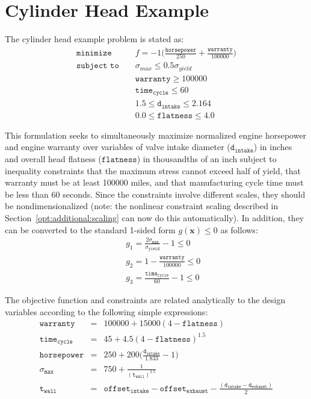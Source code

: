 \section{Cylinder Head Example}\label{additional:cylinder}

The cylinder head example problem is stated as:
\begin{eqnarray}
\texttt{minimize }   & & f=-1\bigg(\frac{\mathtt{horsepower}}{250}+
  \frac{\mathtt{warranty}}{100000}\bigg) \nonumber\\
\texttt{subject to } & & \sigma_{max} \leq 0.5 \sigma_{yield}
  \label{additional:cylhead}\\
                     & & \mathtt{warranty} \geq 100000          \nonumber\\
                     & & \mathtt{time_{cycle}} \leq 60          \nonumber\\
                     & & 1.5 \leq \mathtt{d_{intake}} \leq 2.164\nonumber\\
                     & & 0.0 \leq \mathtt{flatness} \leq 4.0    \nonumber
\end{eqnarray}

This formulation seeks to simultaneously maximize normalized engine
horsepower and engine warranty over variables of valve intake diameter
($\mathtt{d_{intake}}$) in inches and overall head flatness
($\mathtt{flatness}$) in thousandths of an inch subject to inequality
constraints that the maximum stress cannot exceed half of yield, that
warranty must be at least 100000 miles, and that manufacturing cycle
time must be less than 60 seconds. Since the constraints involve
different scales, they should be nondimensionalized (note: the
nonlinear constraint scaling described in
Section~\ref{opt:additional:scaling} can now do this
automatically). In addition, they can be converted to the standard
1-sided form $g(\mathbf{x}) \leq 0$ as follows:
\begin{eqnarray}
  & & g_1=\frac{2\sigma_{\mathtt{max}}}{\sigma_{\mathtt{yield}}}-1 \leq 0
  \nonumber\\
  & & g_2=1-\frac{\mathtt{warranty}}{100000} \leq 0
  \label{additional:cylheadaltg}\\
  & & g_3=\frac{\mathtt{time_{cycle}}}{60}-1 \leq 0\nonumber
\end{eqnarray}

The objective function and constraints are related analytically to the
design variables according to the following simple expressions:
\begin{eqnarray}
\mathtt{warranty}     &=& 100000+15000(4-\mathtt{flatness})\nonumber\\
\mathtt{time_{cycle}} &=& 45+4.5(4-\mathtt{flatness})^{1.5}\nonumber\\
\mathtt{horsepower}   &=& 250+200\bigg(\frac{\mathtt{d_{intake}}}{1.833}-1\bigg)
  \label{additional:cylheadexp}\\
\sigma_{\mathtt{max}} &=& 750+\frac{1}{(\mathtt{t_{wall}})^{2.5}}\nonumber\\
\mathtt{t_{wall}}     &=& \mathtt{offset_{intake}-offset_{exhaust}}-
  \frac{(\mathtt{d_{intake}-d_{exhaust}})}{2}\nonumber
\end{eqnarray}

